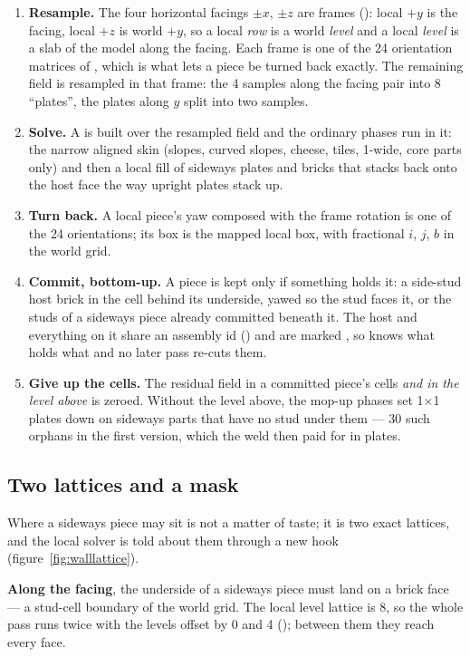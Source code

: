 \begin{enumerate}
\item \textbf{Resample.} The four horizontal facings $\pm x$, $\pm z$ are frames (): local $+y$ is the facing, local
$+z$ is world $+y$, so a local \emph{row} is a world \emph{level} and a local \emph{level} is a slab of the model along the facing.
Each frame is one of the 24 orientation matrices of , which is what lets a piece be turned back exactly. The
remaining field is resampled in that frame: the 4\ldu{} samples along the facing pair into 8\ldu{} ``plates'', the plates along $y$
split into two samples.
\item \textbf{Solve.} A  is built over the resampled field and the ordinary phases run in it: the narrow aligned skin
(slopes, curved slopes, cheese, tiles, 1-wide, core parts only) and then a local fill of sideways plates and bricks that stacks
back onto the host face the way upright plates stack up.
\item \textbf{Turn back.} A local piece's yaw composed with the frame rotation is one of the 24 orientations; its box is the mapped
local box, with fractional $i$, $j$, $b$ in the world grid.
\item \textbf{Commit, bottom-up.} A piece is kept only if something holds it: a side-stud host brick in the cell behind its
underside, yawed so the stud faces it, or the studs of a sideways piece already committed beneath it. The host and everything on
it share an assembly id () and are marked , so  knows what holds what and no later pass
re-cuts them.
\item \textbf{Give up the cells.} The residual field in a committed piece's cells \emph{and in the level above} is zeroed. Without
the level above, the mop-up phases set 1$\times$1 plates down on sideways parts that have no stud under them --- 30 such orphans in
the first version, which the weld then paid for in plates.
\end{enumerate}

\subsection{Two lattices and a mask}
Where a sideways piece may sit is not a matter of taste; it is two exact lattices, and the local solver is told about them through
a new  hook (figure~\ref{fig:walllattice}).

\textbf{Along the facing}, the underside of a sideways piece must land on a brick face --- a stud-cell boundary of the world grid.
The local level lattice is 8\ldu, so the whole pass runs twice with the levels offset by 0 and 4\ldu{} (); between
them they reach every face.

